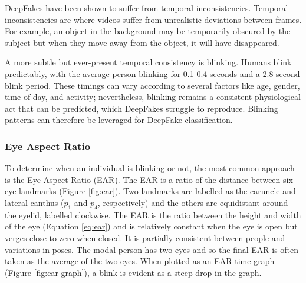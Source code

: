 DeepFakes have been shown to suffer from temporal inconsistencies\cite{juefei2022countering}. Temporal inconsistencies are where videos suffer from unrealistic deviations between frames. For example, an object in the background may be temporarily obscured by the subject but when they move away from the object, it will have disappeared. 

A more subtle but ever-present temporal consistency is blinking. Humans blink predictably, with the average person blinking for 0.1-0.4 seconds and a 2.8 second blink period\cite{schiffman1990sensation}. These timings can vary according to several factors like age, gender, time of day, and activity\cite{jung2020deepvision}; nevertheless, blinking remains a consistent physiological act that can be predicted, which DeepFakes struggle to reproduce. Blinking patterns can therefore be leveraged for DeepFake classification.

\subsubsection{Eye Aspect Ratio}

To determine when an individual is blinking or not, the most common approach is the Eye Aspect Ratio (EAR)\cite{soukupova2016eye}. The EAR is a ratio of the distance between six eye landmarks (Figure \ref{fig:ear}). Two landmarks are labelled as the caruncle and lateral canthus ($p_1$ and $p_4$, respectively) and the others are equidistant around the eyelid, labelled clockwise. The EAR is the ratio between the height and width of the eye (Equation \ref{eq:ear}) and is relatively constant when the eye is open but verges close to zero when closed. It is partially consistent between people and variations in poses. The modal person has two eyes and so the final EAR is often taken as the average of the two eyes. When plotted as an EAR-time graph (Figure \ref{fig:ear-graph}), a blink is evident as a steep drop in the graph. 

